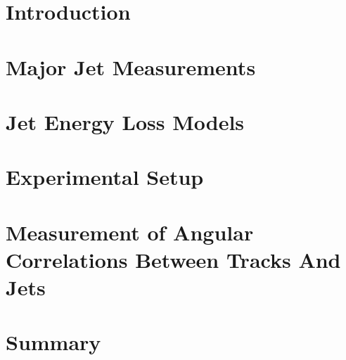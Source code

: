 \documentclass[fullpage, UKenglish]{uiucthesis2009}
\begin{document}
\chapter{Introduction}
\label{sec:theory}

\clearpage

\chapter{Major Jet Measurements}
\label{sec:jetMeasurements}

\clearpage

\chapter{Jet Energy Loss Models}
\label{sec:jetModels}

\clearpage

\chapter{Experimental Setup}
\label{sec:setup}

\clearpage

\chapter{Measurement of Angular Correlations Between Tracks And Jets}
\label{sec:mainanalysis}

\clearpage

\chapter{Summary}
\label{sec:summary}

\clearpage

%
\end{document}
